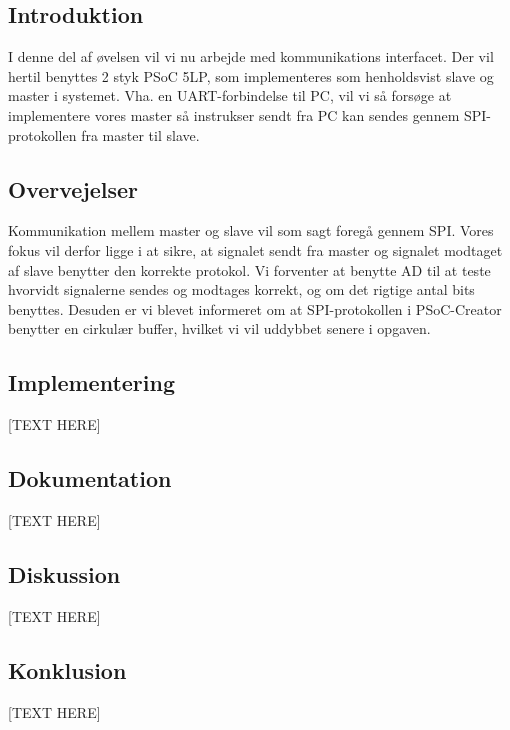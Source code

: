 \documentclass[../main.tex]{subfiles}
\begin{document}
\subsection{Introduktion}
I denne del af øvelsen vil vi nu arbejde med kommunikations interfacet. Der vil hertil benyttes 2 styk PSoC 5LP, som implementeres som henholdsvist slave og master i systemet.
 Vha. en UART-forbindelse til PC, vil vi så forsøge at implementere vores master så instrukser sendt fra PC kan sendes gennem SPI-protokollen fra master til slave.

\subsection{Overvejelser}
Kommunikation mellem master og slave vil som sagt foregå gennem SPI. Vores fokus vil derfor ligge i at sikre, at signalet sendt fra master og signalet modtaget af slave benytter den korrekte protokol.
 Vi forventer at benytte AD til at teste hvorvidt signalerne sendes og modtages korrekt, og om det rigtige antal bits benyttes. Desuden er vi blevet informeret om at SPI-protokollen i PSoC-Creator benytter en cirkulær buffer, hvilket vi vil uddybbet senere i opgaven.

\subsection{Implementering}


[TEXT HERE]

\subsection{Dokumentation}
[TEXT HERE]

\subsection{Diskussion}
[TEXT HERE]

\subsection{Konklusion}
[TEXT HERE]
\end{document}
